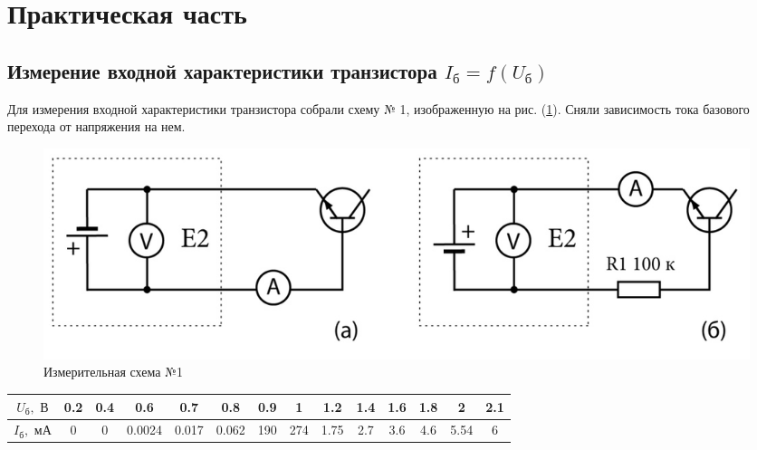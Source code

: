



\label{sec:theory}
\section{Практическая часть}%
\subsection{Измерение входной характеристики транзистора $I_\text{б}=f(U_\text{б})$}
Для измерения входной характеристики транзистора собрали схему № 1,
изображенную на рис. (\ref{fig:8}). Сняли зависимость тока базового перехода от
напряжения на нем.
\begin{figure}[H]
	\centering
	\includegraphics[width=0.6\linewidth]{fig/shema1}
	\caption{Измерительная схема №1}
	\label{fig:8}
\end{figure}
\begin{table}[htbp]
	\centering
	\begin{tabular}{|c|c|c|c|c|c|c|c|c|c|c|c|c|c|}
		\toprule
		$U_\text{б}, \text{ В}$  & 0.2   & 0.4   & 0.6   & 0.7   & 0.8   & 0.9   & 1     & 1.2   & 1.4   & 1.6   & 1.8   & 2     & 2.1 \\
		\midrule
		$I_\text{б}, \text{ мА}$ & 0     & 0     & 0.0024 & 0.017 & 0.062 & 190   & 274   & 1.75  & 2.7   & 3.6   & 4.6   & 5.54  & 6 \\
		\bottomrule
	\end{tabular}%
\end{table}%
